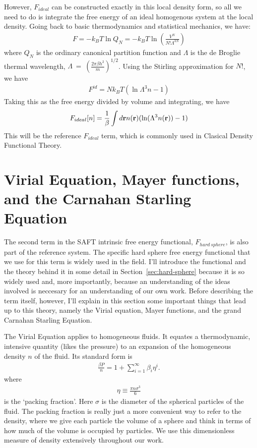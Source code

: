 However, $F_{ideal}$ can be constructed exactly in this local density
form, so all we need to do is integrate the free energy of an ideal
homogenous system at the local density.  Going back to basic
thermodynamics and statistical mechanics, we have:
\begin{align}
  F = -k_BT \ln Q_N = -k_BT \ln \left(\frac{V^N}{N!\Lambda^{3N}}\right)
\end{align}
where $Q_N$ is the ordinary canonical partition function and $\Lambda$
is the de Broglie thermal wavelength, $\Lambda~=~\left(\frac{2\pi\beta
h^2}{m}\right)^{1/2}$.  Using the Stirling approximation for $N!$, we
have
\begin{align}
F^{id} = Nk_BT(\ln \Lambda^3 n - 1)
\end{align}
Taking this as the free energy divided by volume and integrating, we
have
\begin{align}
  F_{ideal}[n] = \frac{1}{\beta}\int d\textbf{r} n(\textbf{r})(\ln (\Lambda^3 n(\textbf{r}))-1)
\end{align}
This will be the reference $F_{ideal}$ term, which is commonly used in
Clasical Density Functional Theory.

\clearpage
\newpage

\section{Virial Equation, Mayer functions, and the Carnahan Starling Equation}

The second term in the SAFT intrinsic free energy functional,
$F_{hard~sphere}$, is also part of the reference system.  The specific
hard sphere free energy functional that we use for this term is widely
used in the field.  I'll introduce the functional and the theory
behind it in some detail in Section~\ref{sec:hard-sphere} because it
is so widely used and, more importantly, because an understanding of
the ideas involved is neccesary for an understanding of our own work.
Before describing the term itself, however, I'll explain in this
section some important things that lead up to this theory, namely the
Virial equation, Mayer functions, and the grand Carnahan Starling
Equation.

The Virial Equation applies to homogeneous fluids.  It equates a
thermodynamic, intensive quantity (likes the pressure) to an expansion
of the homogeneous density $n$ of the fluid.  Its standard form is
\begin{align}
  \label{eq:virial-expansion}
  \frac{\beta P}{n} = 1 + \sum_{i=1}^{\infty}\beta_i\eta^i.
\end{align}
where
\begin{align}
  \eta \equiv \frac{\pi n \sigma^3}{6}
\end{align}
is the `packing fraction'.  Here $\sigma$ is the diameter of the
spherical particles of the fluid.  The packing fraction is really just
a more convenient way to refer to the density, where we give each
particle the volume of a sphere and think in terms of how much of the
volume is occupied by particles.  We use this dimensionless measure of
density extensively throughout our work.

